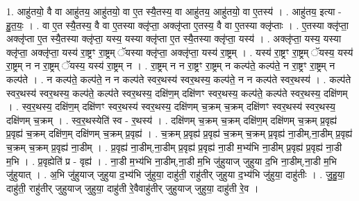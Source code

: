 \documentclass[17pt]{extarticle}
\begin{document}
1. आहु॑तयो॒ वै वा आहु॑तय॒ आहु॑तयो॒ वा ए॒त स्यै॒तस्य॒ वा आहु॑तय॒ आहु॑तयो॒ वा ए॒तस्य॑ । . आहु॑तय॒ इत्या - हु॒त॒यः॒ । . वा ए॒त स्यै॒तस्य॒ वै वा ए॒तस्या क्लृ॑प्ता॒ अक्लृ॑प्ता ए॒तस्य॒ वै वा ए॒तस्या क्लृ॑प्ताः । . ए॒तस्या क्लृ॑प्ता॒ अक्लृ॑प्ता ए॒त स्यै॒तस्या क्लृ॑प्ता॒ यस्य॒ यस्या क्लृ॑प्ता ए॒त स्यै॒तस्या क्लृ॑प्ता॒ यस्य॑ । . अक्लृ॑प्ता॒ यस्य॒ यस्या क्लृ॑प्ता॒ अक्लृ॑प्ता॒ यस्य॑ रा॒ष्ट्रꣳ रा॒ष्ट्रम् ॅयस्या क्लृ॑प्ता॒ अक्लृ॑प्ता॒ यस्य॑ रा॒ष्ट्रम् । . यस्य॑ रा॒ष्ट्रꣳ रा॒ष्ट्रम् ॅयस्य॒ यस्य॑ रा॒ष्ट्रम् न न रा॒ष्ट्रम् ॅयस्य॒ यस्य॑ रा॒ष्ट्रम् न । . रा॒ष्ट्रम् न न रा॒ष्ट्रꣳ रा॒ष्ट्रम् न कल्प॑ते॒ कल्प॑ते॒ न रा॒ष्ट्रꣳ रा॒ष्ट्रम् न कल्प॑ते । . न कल्प॑ते॒ कल्प॑ते॒ न न कल्प॑ते स्वर॒थस्य॑ स्वर॒थस्य॒ कल्प॑ते॒ न न कल्प॑ते स्वर॒थस्य॑ । . कल्प॑ते स्वर॒थस्य॑ स्वर॒थस्य॒ कल्प॑ते॒ कल्प॑ते स्वर॒थस्य॒ दक्षि॑ण॒म् दक्षि॑णꣳ स्वर॒थस्य॒ कल्प॑ते॒ कल्प॑ते स्वर॒थस्य॒ दक्षि॑णम् । . स्व॒र॒थस्य॒ दक्षि॑ण॒म् दक्षि॑णꣳ स्वर॒थस्य॑ स्वर॒थस्य॒ दक्षि॑णम् च॒क्रम् च॒क्रम् दक्षि॑णꣳ स्वर॒थस्य॑ स्वर॒थस्य॒ दक्षि॑णम् च॒क्रम् । . स्व॒र॒थस्येति॑ स्व - र॒थस्य॑ । . दक्षि॑णम् च॒क्रम् च॒क्रम् दक्षि॑ण॒म् दक्षि॑णम् च॒क्रम् प्र॒वृह्य॑ प्र॒वृह्य॑ च॒क्रम् दक्षि॑ण॒म् दक्षि॑णम् च॒क्रम् प्र॒वृह्य॑ । . च॒क्रम् प्र॒वृह्य॑ प्र॒वृह्य॑ च॒क्रम् च॒क्रम् प्र॒वृह्य॑ ना॒डीम्,ना॒डीम् प्र॒वृह्य॑ च॒क्रम् च॒क्रम् प्र॒वृह्य॑ ना॒डीम् । . प्र॒वृह्य॑ ना॒डीम्,ना॒डीम् प्र॒वृह्य॑ प्र॒वृह्य॑ ना॒डी म॒भ्य॑भि ना॒डीम् प्र॒वृह्य॑ प्र॒वृह्य॑ ना॒डी म॒भि । . प्र॒वृह्येति॑ प्र - वृह्य॑ । . ना॒डी म॒भ्य॑भि ना॒डीम्,ना॒डी म॒भि जु॑हुयाज् जुहुया द॒भि ना॒डीम्,ना॒डी म॒भि जु॑हुयात् । . अ॒भि जु॑हुयाज् जुहुया द॒भ्य॑भि जु॑हुया॒ दाहु॑ती॒ राहु॑तीर् जुहुया द॒भ्य॑भि जु॑हुया॒ दाहु॑तीः । . जु॒हु॒या॒ दाहु॑ती॒ राहु॑तीर् जुहुयाज् जुहुया॒ दाहु॑ती रे॒वैवाहु॑तीर् जुहुयाज् जुहुया॒ दाहु॑ती रे॒व । \newline
\end{document}
